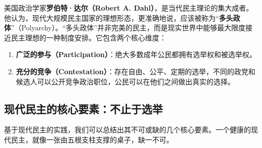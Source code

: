 美国政治学家\textbf{罗伯特·达尔（Robert A. Dahl）}，是当代民主理论的集大成者。他认为，现代大规模民主国家的理想形态，更准确地说，应该被称为“\textbf{多头政体}”（Polyarchy）。“多头政体”并非完美的民主，而是现实世界中能够最大限度接近民主理想的一种制度安排。它包含两个核心维度：

\begin{enumerate}
    \item \textbf{广泛的参与（Participation）}：绝大多数成年公民都拥有选举权和被选举权。
    \item \textbf{充分的竞争（Contestation）}：存在自由、公平、定期的选举，不同的政党和候选人可以公开竞争政治职位，公民可以在他们之间做出真实的选择。
\end{enumerate}

\subsection{现代民主的核心要素：不止于选举}

基于现代民主的实践，我们可以总结出其不可或缺的几个核心要素。一个健康的现代民主，就像一张由五根支柱支撑的桌子，缺一不可。

